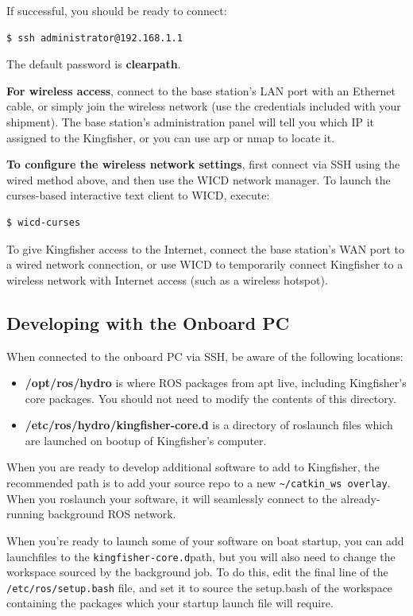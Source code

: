\documentclass[]{clearpath-latex/clearpath-manual}
\begin{document}
If successful, you should be ready to connect:

\begin{lstlisting}
$ ssh administrator@192.168.1.1
\end{lstlisting}

The default password is \textbf{clearpath}.

\textbf{For wireless access}, connect to the base station’s LAN port with an Ethernet cable, or simply join the wireless network (use the credentials included with your shipment). The base station’s administration panel will tell you which IP it assigned to the Kingfisher, or you can use arp or nmap to locate it.

\textbf{To configure the wireless network settings}, first connect via SSH using the wired method above, and then use the WICD network manager. To launch the curses-based interactive text client to WICD, execute:

\begin{lstlisting}
$ wicd-curses
\end{lstlisting}

To give Kingfisher access to the Internet, connect the base station’s WAN port to a wired network connection, or use WICD to temporarily connect Kingfisher to a wireless network with Internet access (such as a wireless hotspot).

\subsection{Developing with the Onboard PC}
When connected to the onboard PC via SSH, be aware of the following locations:

\begin{itemize}[nolistsep]
	\item \textbf{/opt/ros/hydro} is where ROS packages from apt live, including Kingfisher’s core packages. You should not need to modify the contents of this directory.
	\item \textbf{/etc/ros/hydro/kingfisher-core.d} is a directory of roslaunch files which are launched on bootup of Kingfisher’s computer.
\end{itemize}

When you are ready to develop additional software to add to Kingfisher, the recommended path is to add your source repo to a new \lstinline{~/catkin_ws overlay}. When you roslaunch your software, it will seamlessly connect to the already-running background ROS network.

When you’re ready to launch some of your software on boat startup, you can add launchfiles to the \lstinline{kingfisher-core.d}path, but you will also need to change the workspace sourced by the background job. To do this, edit the final line of the \lstinline{/etc/ros/setup.bash} file, and set it to source the setup.bash of the workspace containing the packages which your startup launch file will require.
\end{document}
